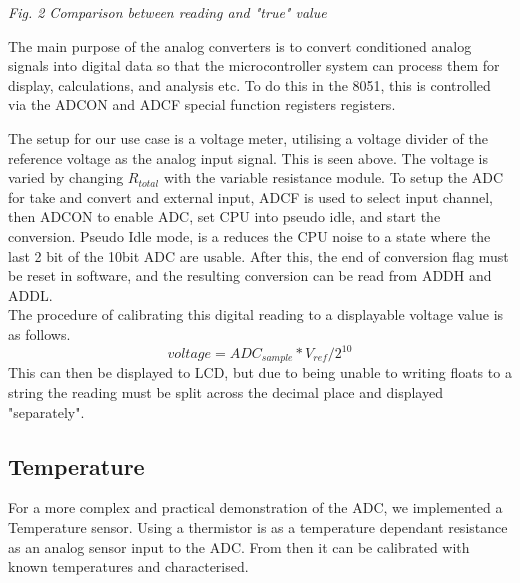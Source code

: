 \documentclass[11pt]{article}
\begin{document}
\begin{preview}
\begin{center}
                \textit{Fig. 2 Comparison between reading and "true" value}  
        \end{center}

        The main purpose of the analog converters is to convert conditioned analog signals into digital data so that the microcontroller system can process them for display, calculations, and analysis etc.
        To do this in the 8051, this is controlled via the ADCON and ADCF special function registers registers. \\

        
        \begin{center}
        \end{center}
        The setup for our use case is a voltage meter, utilising a voltage divider of the reference voltage as the analog input signal. This is seen above. The voltage is varied by changing $R_{total}$ with the variable resistance module.
        To setup the ADC for take and convert and external input, ADCF is used to select input channel, then ADCON to enable ADC, set CPU into pseudo idle, and start the conversion.
        Pseudo Idle mode, is a reduces the CPU noise to a state where the last 2 bit of the 10bit ADC are usable.
        After this, the end of conversion flag must be reset in software, and the resulting conversion can be read from ADDH and ADDL.\\
        
        The procedure of calibrating this digital reading to a displayable voltage value is as follows.
        $$voltage = ADC_{sample} * V_{ref} / 2^{10}$$
        This can then be displayed to LCD, but due to being unable to writing floats to a string the reading must be split across the decimal place and displayed "separately".

        

        \subsection{Temperature}
        For a more complex and practical demonstration of the ADC, we implemented a Temperature sensor. Using a thermistor is as a temperature dependant resistance as an analog sensor input to the ADC. From then it can be calibrated with known temperatures and characterised. 

\end{preview}
\end{document}
